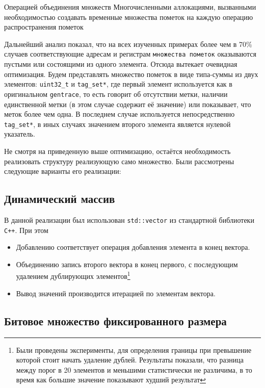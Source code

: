 \begin{itemize}
    \text Операцией объединения множеств
    \text Многочисленными аллокациями, вызванными необходимостью создавать временные множества пометок на каждую операцию распространения пометок
\end{itemize}

Дальнейший анализ показал, что на всех изученных примерах более чем в 70\% случаев соответствующие адресам и регистрам \texttt{множества пометок} оказываются пустыми или состоящими из одного элемента. Отсюда вытекает очевидная оптимизация. Будем представлять множество пометок в виде типа-суммы из двух элементов: \texttt{uint32\_t} и \texttt{tag\_set*}, где первый элемент используется как в оригинальном \texttt{gentrace}, то есть говорит об отсутствии метки, наличии единственной метки (в этом случае содержит её значение) или показывает, что меток более чем одна. В последнем случае используется непосредственно \texttt{tag\_set*}, в иных случаях значением второго элемента является нулевой указатель.

Не смотря на приведенную выше оптимизацию, остаётся необходимость реализовать структуру реализующую само множество. Были рассмотрены следующие варианты его реализации:


\subsection{Динамический массив}

В данной реализации был использован \texttt{std::vector} из стандартной библиотеки \texttt{C++}. При этом 
\begin{itemize}
    \item Добавлению соответствует операция добавления элемента в конец вектора.
    \item Объединению запись второго вектора в конец первого, с последующим удалением дублирующих элементов\footnote{Были проведены эксперименты, для определения границы при превышение которой стоит начать удаление дублей. Результаты показали, что разница между порог в 20 элементов и меньшими статистически не различима, в то время как большие значение показывают худший результат}
    \item Вывод значений производится итерацией по элементам вектора.
\end{itemize}

\subsection{Битовое множество фиксированного размера}

